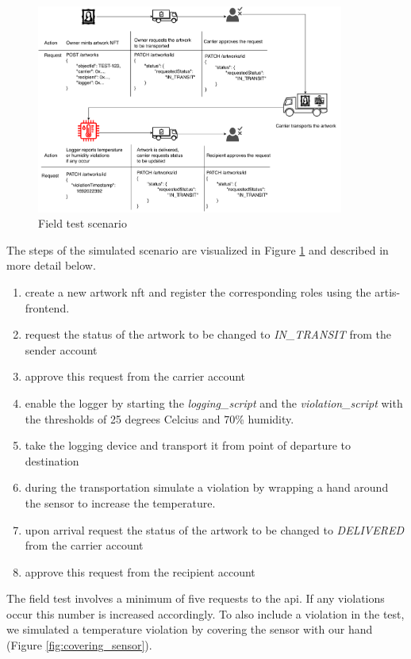 \begin{figure}[h]
    \centering
    \includegraphics[width=0.9\textwidth]{diagrams/evaluation_scenario_v2.drawio.pdf}
    \caption{Field test scenario}
    \label{fig:eval_scenario}
\end{figure}

The steps of the simulated scenario are visualized in Figure \ref{fig:eval_scenario} and described in more detail below.

\begin{enumerate}
    \item create a new artwork \gls{nft} and register the corresponding roles using the artis-frontend.
    \item request the status of the artwork to be changed to \textit{IN\_TRANSIT} from the sender account
    \item approve this request from the carrier account
    \item enable the logger by starting the \textit{logging\_script} and the \textit{violation\_script} with the thresholds of 25 degrees Celcius and 70\% humidity.
    \item take the logging device and transport it from point of departure to destination
    \item during the transportation simulate a violation by wrapping a hand around the sensor to increase the temperature.
    \item upon arrival request the status of the artwork to be changed to \textit{DELIVERED} from the carrier account
    \item approve this request from the recipient account
\end{enumerate}

The field test involves a minimum of five requests to the \gls{api}. If any violations occur this number is increased accordingly. To also include a violation in the test, we simulated a temperature violation by covering the sensor with our hand (Figure \ref{fig:covering_sensor}).

